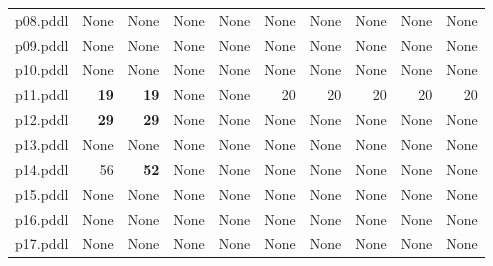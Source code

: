 \documentclass{article}
\begin{document}
\begin{tabular}{@{}lrrrrrrrrr@{}}
p08.pddl & \multicolumn{1}{|l|}{None} & \multicolumn{1}{|l|}{None} & \multicolumn{1}{|l|}{None} & \multicolumn{1}{|l|}{None} & \multicolumn{1}{|l|}{None} & \multicolumn{1}{|l|}{None} & \multicolumn{1}{|l|}{None} & \multicolumn{1}{|l|}{None} & \multicolumn{1}{|l|}{None} \\
p09.pddl & \multicolumn{1}{|l|}{None} & \multicolumn{1}{|l|}{None} & \multicolumn{1}{|l|}{None} & \multicolumn{1}{|l|}{None} & \multicolumn{1}{|l|}{None} & \multicolumn{1}{|l|}{None} & \multicolumn{1}{|l|}{None} & \multicolumn{1}{|l|}{None} & \multicolumn{1}{|l|}{None} \\
p10.pddl & \multicolumn{1}{|l|}{None} & \multicolumn{1}{|l|}{None} & \multicolumn{1}{|l|}{None} & \multicolumn{1}{|l|}{None} & \multicolumn{1}{|l|}{None} & \multicolumn{1}{|l|}{None} & \multicolumn{1}{|l|}{None} & \multicolumn{1}{|l|}{None} & \multicolumn{1}{|l|}{None} \\
p11.pddl & \textbf{19} & \textbf{19} & \multicolumn{1}{|l|}{None} & \multicolumn{1}{|l|}{None} & 20 & 20 & 20 & 20 & 20 \\
p12.pddl & \textbf{29} & \textbf{29} & \multicolumn{1}{|l|}{None} & \multicolumn{1}{|l|}{None} & \multicolumn{1}{|l|}{None} & \multicolumn{1}{|l|}{None} & \multicolumn{1}{|l|}{None} & \multicolumn{1}{|l|}{None} & \multicolumn{1}{|l|}{None} \\
p13.pddl & \multicolumn{1}{|l|}{None} & \multicolumn{1}{|l|}{None} & \multicolumn{1}{|l|}{None} & \multicolumn{1}{|l|}{None} & \multicolumn{1}{|l|}{None} & \multicolumn{1}{|l|}{None} & \multicolumn{1}{|l|}{None} & \multicolumn{1}{|l|}{None} & \multicolumn{1}{|l|}{None} \\
p14.pddl & 56 & \textbf{52} & \multicolumn{1}{|l|}{None} & \multicolumn{1}{|l|}{None} & \multicolumn{1}{|l|}{None} & \multicolumn{1}{|l|}{None} & \multicolumn{1}{|l|}{None} & \multicolumn{1}{|l|}{None} & \multicolumn{1}{|l|}{None} \\
p15.pddl & \multicolumn{1}{|l|}{None} & \multicolumn{1}{|l|}{None} & \multicolumn{1}{|l|}{None} & \multicolumn{1}{|l|}{None} & \multicolumn{1}{|l|}{None} & \multicolumn{1}{|l|}{None} & \multicolumn{1}{|l|}{None} & \multicolumn{1}{|l|}{None} & \multicolumn{1}{|l|}{None} \\
p16.pddl & \multicolumn{1}{|l|}{None} & \multicolumn{1}{|l|}{None} & \multicolumn{1}{|l|}{None} & \multicolumn{1}{|l|}{None} & \multicolumn{1}{|l|}{None} & \multicolumn{1}{|l|}{None} & \multicolumn{1}{|l|}{None} & \multicolumn{1}{|l|}{None} & \multicolumn{1}{|l|}{None} \\
p17.pddl & \multicolumn{1}{|l|}{None} & \multicolumn{1}{|l|}{None} & \multicolumn{1}{|l|}{None} & \multicolumn{1}{|l|}{None} & \multicolumn{1}{|l|}{None} & \multicolumn{1}{|l|}{None} & \multicolumn{1}{|l|}{None} & \multicolumn{1}{|l|}{None} & \multicolumn{1}{|l|}{None} \\

\end{tabular}
\end{document}
